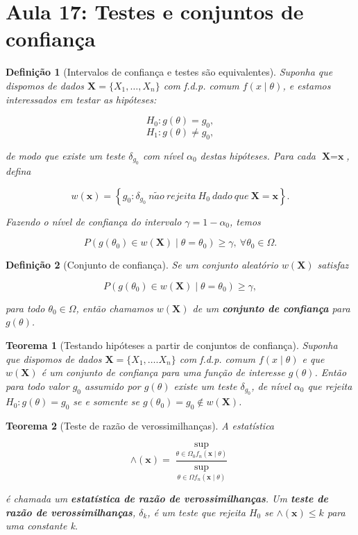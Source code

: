 \documentclass{article}
\newtheorem{theorem}{Teorema}
\newtheorem{definition}{Definição}
\begin{document}
\section*{Aula 17: Testes e conjuntos de confiança}
\label{s17}
\begin{definition}[Intervalos de confiança e testes são equivalentes]

Suponha que dispomos de dados $\textbf{X} = \{ X_1, \ldots, X_n \}$ com f.d.p. comum $f(x \mid \theta)$, e estamos interessados em testar as hipóteses:

$$H_0 : g(\theta) = g_0,$$
$$H_1 : g(\theta) \neq g_0,$$

de modo que existe um teste $\delta_{g_0}$ com nível $\alpha_0$ destas hipóteses. Para cada $\textbf{X} = \textbf{x}$, defina

$$w(\textbf{x}) = \left\{g_0: \delta_{g_0} \:n\tilde{a}o\:rejeita\: H_0 \:dado\:que\: \textbf{X} = \textbf{x} \right\}.$$

Fazendo o nível de confiança do intervalo $\gamma = 1 - \alpha_0$, temos

$$P(g(\theta_0) \in w(\textbf{X}) \mid \theta = \theta_0) \geq \gamma, \ \forall \theta_0 \in \Omega.$$
\end{definition}

\begin{definition}[Conjunto de confiança]
Se um conjunto aleatório $w(\textbf{X})$ satisfaz

$$P(g(\theta_0) \in w(\textbf{X}) \mid \theta = \theta_0) \geq \gamma,$$

para todo $\theta_0 \in \Omega$, então chamamos $w(\textbf{X})$ de um \textbf{conjunto de confiança} para $g(\theta)$.
\end{definition}

\begin{theorem}[Testando hipóteses a partir de conjuntos de confiança]
Suponha que dispomos de dados $\textbf{X} = \{ X_1, \ldots. X_n \}$ com f.d.p. comum $f(x \mid \theta)$ e que $w(\textbf{X})$ é um conjunto de confiança para uma função de interesse $g(\theta)$. Então para todo valor $g_0$ assumido por $g(\theta)$ existe um teste $\delta_{g_0}$, de nível $\alpha_0$ que rejeita $H_0 : g(\theta) = g_0$ se e somente se $g(\theta_0) = g_0 \notin w(\textbf{X})$.
\end{theorem}

\begin{theorem}[Teste de razão de verossimilhanças]
A estatística

$$\wedge(\textbf{x}) = \frac{\sup_{\theta \in \Omega_0 f_n (\textbf{x} \mid \theta)}}{\sup_{\theta \in \Omega f_n (\textbf{x} \mid \theta)}}$$

é chamada um \textbf{estatística de razão de verossimilhanças}. Um \textbf{teste de razão de verossimilhanças}, $\delta_k$, é um teste que rejeita $H_0$ se $\wedge(\textbf{x}) \leq k$ para uma constante k.
\end{theorem}
\end{document}
